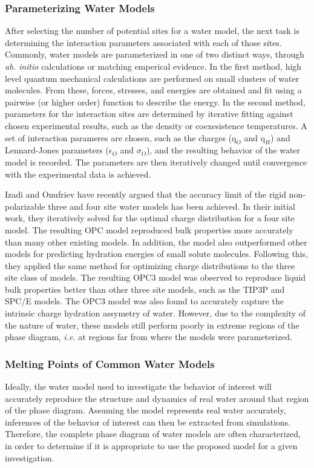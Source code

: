 \subsubsection{Parameterizing Water Models}
After selecting the number of potential sites for a water model, the
next task is determining the interaction parameters associated with
each of those sites. Commonly, water models are parameterized in one
of two distinct ways, through \textit{ab. initio} calculations or
matching emperical evidence. In the first method, high level quantum
mechanical calculations are performed on small clusters of water
molecules. From these, forces, stresses, and energies are obtained and
fit using a pairwise (or higher order) function to describe the
energy. In the second method, parameters for the interaction sites are
determined by iterative fitting against chosen experimental results,
such as the density or coexesistence temperatures. A set of
interaction parameres are chosen, such as the charges ($\mathrm{q}_O$
and $\mathrm{q}_H$) and Lennard-Jones parameters ($\epsilon_O$ and
$\sigma_O$), and the resulting behavior of the water model is
recorded. The parameters are then iteratively changed until
convergence with the experimental data is achieved. 

Izadi and Onufriev have recently argued that the accuracy limit of the
rigid non-polarizable three and four site water models has been
achieved.\cite{Izadi2014,Izadi2016} In their initial work, they
iteratively solved for the optimal charge distribution for a four site
model.\cite{Izadi2014} The resulting OPC model reproduced bulk
properties more accurately than many other existing models. In
addition, the model also outperformed other models for predicting
hydration energies of small solute molecules. Following this, they
applied the same method for optimizing charge distributions to the
three site class of models. The resulting OPC3 model was observed
to reproduce liquid bulk properties better than other three site
models, such as the TIP3P and SPC/E models. The OPC3 model was also
found to accurately capture the intrinsic charge hydration assymetry
of water. However, due to the complexity of the nature of water, these
models still perform poorly in extreme regions of the phase diagram,
\textit{i.e.} at regions far from where the models were parameterized.

\subsubsection{Melting Points of Common Water Models}
Ideally, the water model used to investigate the behavior of interest
will accurately reproduce the structure and dynamics of real water
around that region of the phase diagram. Assuming the model represents
real water accurately, inferences of the behavior of interest can then
be extracted from simulations. Therefore, the complete phase diagram
of water models are often characterized, in order to determine if it
is appropriate to use the proposed model for a given investigation.

